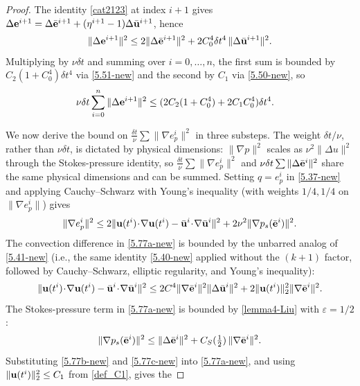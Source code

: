 \documentclass{article}
\theoremstyle{definition}                   %
\begin{document}
\begin{proof}
The identity \eqref{cat2123} at index $i+1$ gives
$\Delta{\bf e}^{i+1}=\Delta\bar{\bf e}^{i+1}+(\eta^{i+1}-1)\Delta\bar{\bf u}^{i+1}$,
hence
\[
\|\Delta{\bf e}^{i+1}\|^2
\le 2\|\Delta\bar{\bf e}^{i+1}\|^2 + 2C_0^4\delta t^4\,\|\Delta\bar{\bf u}^{i+1}\|^2.
\]
Multiplying by $\nu\delta t$ and summing over $i=0,\dots,n$, the first
sum is bounded by $C_2(1+C_0^4)\delta t^4$ via \eqref{5.51-new} and the
second by $C_1$ via \eqref{5.50-new}, so
\begin{align}
\nu \delta t \sum_{i=0}^{n} \|\Delta{\bf e}^{i+1} \|^2
&\le (2C_2  (1+C_0^4) + 2C_1C_0^4) \delta t^4.
\label{5.76-new}
\end{align}


We now derive the bound on $\tfrac{\delta t}{\nu}\sum\|\nabla e^i_p\|^2$ in three
substeps. The weight $\delta t/\nu$, rather than $\nu\delta t$, is dictated
by physical dimensions: $\|\nabla p\|^2$ scales as $\nu^2\|\Delta u\|^2$
through the Stokes-pressure identity, so $\tfrac{\delta t}{\nu}\sum\|\nabla
e^i_p\|^2$ and $\nu\delta t\sum\|\Delta\bar{\bf e}^i\|^2$ share the same
physical dimensions and can be summed.
Setting $q=e^i_p$ in \eqref{5.37-new} and applying
Cauchy--Schwarz with Young's inequality (with weights $1/4,1/4$ on
$\|\nabla e^i_p\|$) gives
\begin{equation}
\|\nabla e^i_p\|^2
\le 2\|{\bf u}(t^i)\!\cdot\!\nabla{\bf u}(t^i)-\bar{\bf u}^i\!\cdot\!\nabla\bar{\bf u}^i\|^2
+ 2\nu^2\|\nabla p_s(\bar{\bf e}^i)\|^2.
\label{5.77a-new}
\end{equation}
The convection difference in \eqref{5.77a-new} is bounded by the
unbarred analog of \eqref{5.41-new} (i.e., the same identity \eqref{5.40-new}
applied without the $(k+1)$ factor, followed by Cauchy--Schwarz, elliptic
regularity, and Young's inequality):
\begin{equation}
\|{\bf u}(t^i)\!\cdot\!\nabla{\bf u}(t^i)-\bar{\bf u}^i\!\cdot\!\nabla\bar{\bf u}^i\|^2
\le 2C^4\|\nabla\bar{\bf e}^i\|^2\|\Delta\bar{\bf u}^i\|^2
+ 2\|{\bf u}(t^i)\|_2^2\|\nabla\bar{\bf e}^i\|^2.
\label{5.77b-new}
\end{equation}
The Stokes-pressure term in \eqref{5.77a-new} is bounded by
\eqref{lemma4-Liu} with $\varepsilon=1/2$:
\begin{equation}
\|\nabla p_s(\bar{\bf e}^i)\|^2\le \|\Delta\bar{\bf e}^i\|^2 + C_S(\tfrac12)\,\|\nabla\bar{\bf e}^i\|^2.
\label{5.77c-new}
\end{equation}
Substituting \eqref{5.77b-new} and \eqref{5.77c-new} into \eqref{5.77a-new},
and using $\|{\bf u}(t^i)\|_2^2 \le C_1$ from \eqref{def_C1}, gives the

\end{proof}
\end{document}
